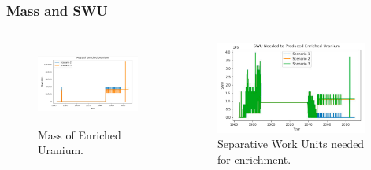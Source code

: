 \begin{frame}
        \frametitle{Mass and SWU}
        \begin{columns}
                \column[t]{5cm}
                \begin{figure}
                        \begin{center}
                                \includegraphics[height=2.7cm]{./images/mass.png}
                        \end{center}
                                \caption{Mass of Enriched Uranium.}
                        \label{fig:mass}
                \end{figure}
                \column[t]{5cm}
                \begin{figure}[htbp!]
                        \begin{center}
                                \includegraphics[height=3cm]{./images/swu.png}
                        \end{center}
                                \caption{Separative Work Units needed for enrichment.}
                        \label{fig:swu}
                \end{figure}
              \end{columns}
\end{frame}



